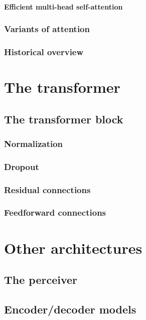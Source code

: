 \documentclass{pca}
\theoremstyle{theorem}
\theoremstyle{definition}
\theoremstyle{proof}
\begin{document}
\subsubsection{Efficient multi-head self-attention}


\subsection{Variants of attention}

\subsection{Historical overview}

\chapter{The transformer}

\section{The transformer block}

\subsection{Normalization}
\subsection{Dropout}
\subsection{Residual connections}


\subsection{Feedforward connections}

\chapter{Other architectures}

\section{The perceiver}
\section{Encoder/decoder models}
\end{document}
